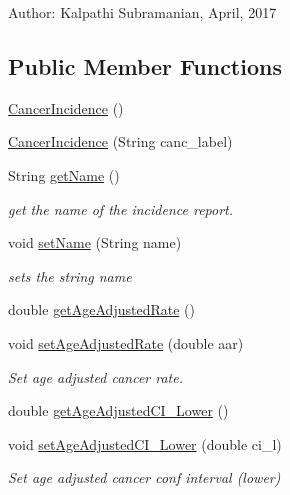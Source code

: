 Author\+: Kalpathi Subramanian, April, 2017 \subsection*{Public Member Functions}
\begin{DoxyCompactItemize}
\item 
\mbox{\hyperlink{classbridges_1_1data__src__dependent_1_1_cancer_incidence_a92db1eb4292c77f07619019587caf5cc}{Cancer\+Incidence}} ()
\item 
\mbox{\hyperlink{classbridges_1_1data__src__dependent_1_1_cancer_incidence_a3db553c2769892563c3f1ebb033ba4c6}{Cancer\+Incidence}} (String canc\+\_\+label)
\item 
String \mbox{\hyperlink{classbridges_1_1data__src__dependent_1_1_cancer_incidence_ac7958f37807979cf06e712373f080b9a}{get\+Name}} ()
\begin{DoxyCompactList}\small\item\em get the name of the incidence report. \end{DoxyCompactList}\item 
void \mbox{\hyperlink{classbridges_1_1data__src__dependent_1_1_cancer_incidence_a1aef58b128adfd1e2a31ab9726247e9e}{set\+Name}} (String name)
\begin{DoxyCompactList}\small\item\em sets the string name \end{DoxyCompactList}\item 
double \mbox{\hyperlink{classbridges_1_1data__src__dependent_1_1_cancer_incidence_a87bc1cbc5a72eb9b4df5ff7ab4843ae8}{get\+Age\+Adjusted\+Rate}} ()
\item 
void \mbox{\hyperlink{classbridges_1_1data__src__dependent_1_1_cancer_incidence_a26c2d63e8465bcfdab047129312b4897}{set\+Age\+Adjusted\+Rate}} (double aar)
\begin{DoxyCompactList}\small\item\em Set age adjusted cancer rate. \end{DoxyCompactList}\item 
double \mbox{\hyperlink{classbridges_1_1data__src__dependent_1_1_cancer_incidence_a7e5dab6d140f2a8e162c5d5c514c74c1}{get\+Age\+Adjusted\+C\+I\+\_\+\+Lower}} ()
\item 
void \mbox{\hyperlink{classbridges_1_1data__src__dependent_1_1_cancer_incidence_a4cd8ce7c68f00d2cd15928764cc32c09}{set\+Age\+Adjusted\+C\+I\+\_\+\+Lower}} (double ci\+\_\+l)
\begin{DoxyCompactList}\small\item\em Set age adjusted cancer conf interval (lower) \end{DoxyCompactList}\item 

\end{DoxyCompactItemize}
